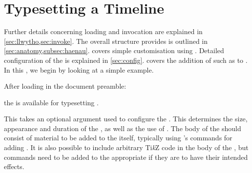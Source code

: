 \documentclass[10pt,british,a4paper]{ltxdoc}
\newcommand*\pkg[1]{\textpkg{#1}}
\newcommand*\TikZ{Ti\emph{k}Z}
\begin{document}
\textbf{}



\section{Typesetting a Timeline}\label{sec:ee}

Further details concerning loading and invocation are explained in \cref{sec:llwytho,sec:invoke}.
The overall structure \pkg{chronos} provides is outlined in \cref{sec:anatomy,subsec:haenau}.
 covers simple customisation using \conceptname[idx as={colour scheme,chronos style},no idx]{\colschemeslabelname,\chronosstyleslabelname}.
Detailed configuration  of the  is explained in \cref{sec:config}.
 covers the addition of \conceptname[idx as=element,type=concept,no idx]{\elementslabelname} such as  to .
In this , we begin by looking at a simple example.

After loading  in the document preamble:
\begin{chronoscode}[chronos]
\usepackage{chronos}
\end{chronoscode}
the  \envlabelname{} is available for typesetting .
\begin{chronoscode}[chronos]
\begin{chronos}
  []
\end{chronos}
\end{chronoscode}
This takes an optional argument used to configure the .
This determines the size, appearance and duration of the , as well as the use of .
The body of the \envlabelname{} should consist of material to be added to the  itself, typically using \pkg{chronos}'s commands for adding .
It is also possible to include arbitrary \TikZ{} code in the body of the \envlabelname{}, but commands need to be added to the appropriate \pkg{chronos}  if they are to have their intended effects.
\end{document}
